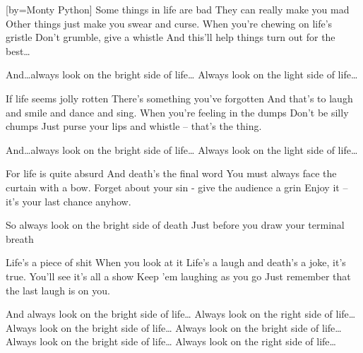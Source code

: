 [by={Monty Python}]
\beginverse
Some things in life are bad
They can really make you mad
Other things just make you swear and curse.
When you're chewing on life's gristle
Don't grumble, give a whistle
And this'll help things turn out for the best\dots
\endverse

\beginchorus
And\dots always look on the bright side of life\dots
Always look on the light side of life\dots
\endchorus

\beginverse
If life seems jolly rotten
There's something you've forgotten
And that's to laugh and smile and dance and sing.
When you're feeling in the dumps
Don't be silly chumps
Just purse your lips and whistle -- that's the thing.
\endverse

\beginchorus
And\dots always look on the bright side of life\dots
Always look on the light side of life\dots
\endchorus

\beginverse
For life is quite absurd
And death's the final word
You must always face the curtain with a bow.
Forget about your sin - give the audience a grin
Enjoy it -- it's your last chance anyhow.
\endverse

\beginchorus
So always look on the bright side of death
Just before you draw your terminal breath
\endchorus

\beginverse
Life's a piece of shit
When you look at it
Life's a laugh and death's a joke, it's true.
You'll see it's all a show
Keep 'em laughing as you go
Just remember that the last laugh is on you.
\endverse

\beginchorus
And always look on the bright side of life\dots
Always look on the right side of life\dots
{}
Always look on the bright side of life\dots
Always look on the bright side of life\dots
{}
Always look on the bright side of life\dots
{}
Always look on the right side of life\dots
\endchorus
\endsong